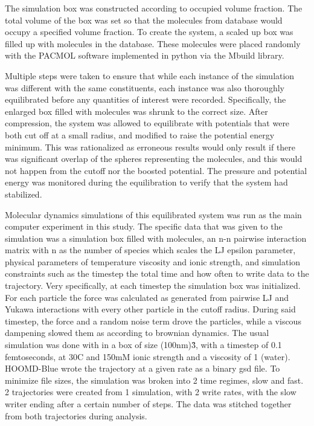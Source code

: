 \documentclass[draft, english]{volcanica-template}
\begin{document}
The simulation box was constructed according to occupied volume fraction. The total volume of the box was set so that the molecules from database would occupy a specified volume fraction. To create the system, a scaled up box was filled up with molecules in the database. These molecules were placed randomly with the PACMOL software implemented in python via the Mbuild library.

Multiple steps were taken to ensure that while each instance of the simulation was different with the same constituents, each instance was also thoroughly equilibrated before any quantities of interest were recorded. Specifically, the enlarged box filled with molecules was shrunk to the correct size. After compression, the system was allowed to equilibrate with potentials that were both cut off at a small radius, and modified to raise the potential energy minimum. This was rationalized as erroneous results would only result if there was significant overlap of the spheres representing the molecules, and this would not happen from the cutoff nor the boosted potential. The pressure and potential energy was monitored during the equilibration to verify that the system had stabilized.

Molecular dynamics simulations of this equilibrated system was run as the main computer experiment in this study. The specific data that was given to the simulation was a simulation box filled with molecules, an n-n pairwise interaction matrix with n as the number of species which scales the LJ epsilon parameter, physical parameters of temperature viscosity and ionic strength, and simulation constraints such as the timestep the total time and how often to write data to the trajectory. Very specifically, at each timestep the simulation box was initialized. For each particle the force was calculated as generated from pairwise LJ and Yukawa interactions with every other particle in the cutoff radius. During said timestep, the force and a random noise term drove the particles, while a viscous dampening slowed them as according to brownian dynamics. The usual simulation was done with in a box of size (100nm)\^3, with a timestep of 0.1 femtoseconds, at 30C  and 150mM ionic strength and a viscosity of 1 (water). HOOMD-Blue wrote the trajectory at a given rate as a binary gsd file. To minimize file sizes, the simulation was broken into 2 time regimes, slow and fast. 2 trajectories were created from 1 simulation, with 2 write rates, with the slow writer ending after a certain number of steps. The data was stitched together from both trajectories during analysis.
\end{document}
